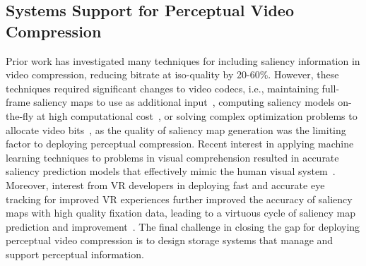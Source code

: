 \subsection{Systems Support for Perceptual Video Compression} Prior work has investigated many techniques for including saliency information in video compression, reducing bitrate at iso-quality by 20-60\%.
However, these techniques required significant changes to video codecs, i.e., maintaining full-frame saliency maps to use as additional input~\cite{8117038}, computing saliency models on-the-fly at high computational cost~\cite{5223506}, or solving complex optimization problems to allocate video bits~\cite{li2011visual}, as the quality of saliency map generation was the limiting factor to deploying perceptual compression.
Recent interest in applying machine learning techniques to problems in visual comprehension resulted in accurate saliency prediction models that effectively mimic the human visual system~\cite{bylinskii2016saliency}.
Moreover, interest from VR developers in deploying fast and accurate eye tracking for improved VR experiences further improved the accuracy of saliency maps with high quality fixation data, leading to a virtuous cycle of saliency map prediction and improvement~\cite{Whitmire:2016:ESC:2971763.2971771}.
The final challenge in closing the gap for deploying perceptual video compression is to design storage systems that manage and support perceptual information.

